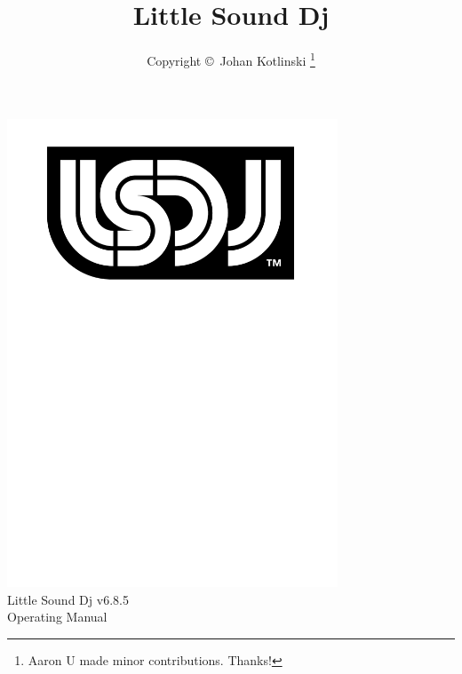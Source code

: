 \documentclass[a4paper,12pt,titlepage]{book}
\author{Copyright \copyright~Johan Kotlinski \thanks{Aaron U made minor contributions. Thanks!}}
\title{Little Sound Dj \lsdjversion{}}
\newcommand{\lsdjversion}{v6.8.5}
\begin{document}
\begin{titlepage}
\begin{center}
\vspace*{2.75cm}
\includegraphics[width=9.85cm]{lsdj_black_rgb}\\
\vspace*{1.00cm}
\normalfont\sffamily
\LARGE
Little Sound Dj \lsdjversion{}
\\
\vspace*{0.65cm}
Operating Manual
\end{center}
\end{titlepage}

\maketitle
\tableofcontents








\end{document}
